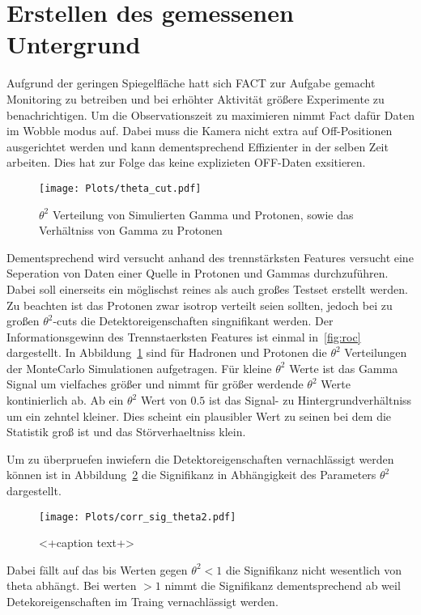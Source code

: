 \section{Erstellen des gemessenen Untergrund}
Aufgrund der geringen Spiegelfläche hatt sich FACT zur Aufgabe gemacht Monitoring zu betreiben und bei erhöhter Aktivität größere Experimente zu benachrichtigen.
Um die Observationszeit zu maximieren nimmt Fact dafür Daten im Wobble modus auf. 
Dabei muss die Kamera nicht extra auf Off-Positionen ausgerichtet werden und kann dementsprechend Effizienter in der selben Zeit arbeiten. 
Dies hat zur Folge das keine explizieten OFF-Daten exsitieren. 
\begin{figure}[H]
  \centering
  \texttt{[image: Plots/theta\_cut.pdf]}
  \caption{$\theta^{2}$ Verteilung von Simulierten Gamma und Protonen, sowie das Verhältniss von Gamma zu Protonen}
  \label{fig:thetacut}
\end{figure}
Dementsprechend wird versucht anhand des trennstärksten Features versucht eine Seperation von Daten einer Quelle in Protonen und Gammas durchzuführen. 
Dabei soll einerseits ein möglischst reines als auch großes Testset erstellt werden. 
Zu beachten ist das Protonen zwar isotrop verteilt seien sollten, jedoch bei zu großen $\theta^{2}$-cuts die Detektoreigenschaften singnifikant werden.
Der Informationsgewinn des Trennstaerksten Features ist einmal in~\ref{fig:roc} dargestellt. In Abbildung~\ref{fig:thetacut} sind für Hadronen und Protonen die $\theta^{2}$ Verteilungen der MonteCarlo Simulationen aufgetragen. 
Für kleine $\theta^{2}$ Werte ist das Gamma Signal um vielfaches größer und nimmt für größer werdende $\theta^{2}$ Werte kontinierlich ab. 
Ab ein $\theta^{2}$ Wert von $0.5$ ist das Signal- zu Hintergrundverhältniss um ein zehntel kleiner. 
Dies scheint ein plausibler Wert zu seinen bei dem die Statistik groß ist und das Störverhaeltniss klein.

Um zu überpruefen inwiefern die Detektoreigenschaften vernachlässigt werden können ist in Abbildung~\ref{fig:corrtheta} die Signifikanz in Abhängigkeit des Parameters $\theta^{2}$ dargestellt.
\begin{figure}[H]
  \centering
  \texttt{[image: Plots/corr\_sig\_theta2.pdf]}
  \caption{<+caption text+>}
  \label{fig:corrtheta}
\end{figure}
Dabei fällt auf das bis Werten gegen $\theta^{2} < 1$ die Signifikanz nicht wesentlich von theta abhängt. Bei werten $>1$ nimmt die Signifikanz dementsprechend ab weil Detekoreigenschaften im Traing vernachlässigt werden.
